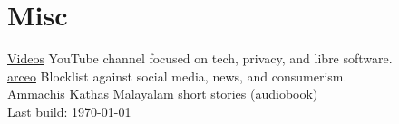 \documentclass[a4,12pt]{article}
\begin{document}
\section{Misc}
\href{https://polarhive.net/videos}{Videos} YouTube channel focused on tech, privacy, and libre software.\\
\href{https://polarhive.net/arceo}{arceo} Blocklist against social media, news, and consumerism. \\
\href{https://polarhive.net/ammachiskathas}{Ammachis Kathas} Malayalam short stories (audiobook) \\

\href{https://github.com/polarhive/resume}{} Last build: \today
\end{document}
